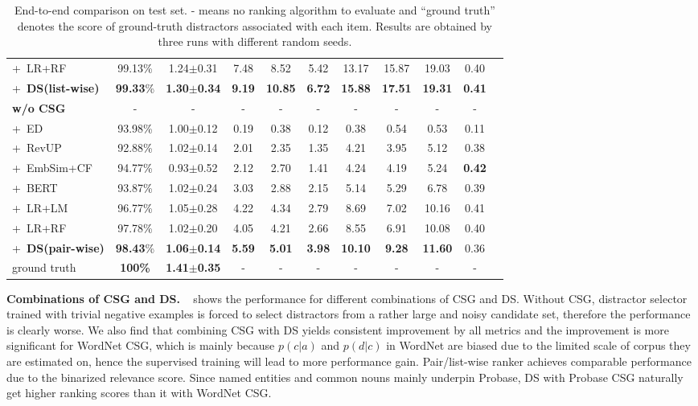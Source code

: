 \begin{table}[t!]
\begin{tabular}{lc cc c c c c c cc}
		+~LR+RF &99.13\%  &1.24$\pm$0.31   &7.48 &8.52 &5.42 &13.17   &15.87 &19.03 &0.40\\
		+~\textbf{DS(list-wise)} &\textbf{99.33}\%  &\textbf{1.30$\pm$0.34} &\textbf{9.19}  &\textbf{10.85} &\textbf{6.72} &\textbf{15.88} &\textbf{17.51} &\textbf{19.31} &\textbf{0.41} \\
		\midrule
		\textbf{w/o CSG} &- &- &- &- &- &-  &- &- &- \\
		+~ED &93.98\%  &1.00$\pm$0.12  &0.19 &0.38  &0.12  &0.38  &0.54  &0.53  &0.11 \\
		+~RevUP &92.88\%  &1.02$\pm$0.14  &2.01 &2.35  &1.35  &4.21  &3.95  &5.12  &0.38 \\
		+~EmbSim+CF &94.77\%  &0.93$\pm$0.52  &2.12 &2.70  &1.41  &4.24  &4.19  &5.24  &\textbf{0.42} \\
		+~BERT &93.87\% &1.02$\pm$0.24  &3.03 &2.88  &2.15  &5.14  &5.29  &6.78  &0.39 \\
		+~LR+LM &96.77\%  &1.05$\pm$0.28   &4.22  &4.34  &2.79 &8.69 &7.02 &10.16 &0.41 \\
		+~LR+RF &97.78\%  &1.02$\pm$0.20   &4.05  &4.21 &2.66 &8.55 &6.91 &10.08 &0.40\\
		+~\textbf{DS(pair-wise)} &\textbf{98.43}\%  &\textbf{1.06$\pm$0.14} &\textbf{5.59} &\textbf{5.01} &\textbf{3.98} &\textbf{10.10}  &\textbf{9.28} &\textbf{11.60} &0.36\\
		\midrule
		ground truth &\textbf{100\%}  &\textbf{1.41$\pm$0.35}  & - & - & - & - & - & - & -\\
		\bottomrule
	\end{tabular}
	\caption{End-to-end comparison on test set. - means no ranking algorithm to evaluate and ``ground truth'' denotes the score of ground-truth distractors associated with each item. Results are obtained by three runs with different random seeds.}
	\label{table:human}
\end{table}
\textbf{Combinations of CSG and DS.} ~ shows the performance for different combinations of CSG and DS. Without CSG, distractor selector trained with trivial negative examples is forced to select distractors from a rather large and noisy candidate set, therefore the performance is clearly worse. 
We also find that combining CSG with DS yields consistent improvement 
by all metrics and the improvement is more significant for WordNet CSG, 
which is mainly because $p(c|a)$ and $p(d|c)$ in WordNet are biased 
due to the limited scale of corpus they are estimated on, hence the 
supervised training will lead to more performance gain. Pair/list-wise ranker achieves comparable performance due to the binarized relevance score.
Since named entities and common nouns mainly underpin Probase, 
DS with Probase CSG naturally get higher ranking scores
than it with WordNet CSG.



